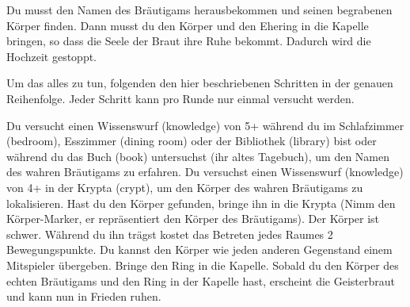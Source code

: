 





Du musst den Namen des Bräutigams herausbekommen und seinen begrabenen Körper finden. Dann musst du den Körper und den Ehering in die Kapelle bringen, so dass die Seele der Braut ihre Ruhe bekommt. Dadurch wird die Hochzeit gestoppt.

\newpage


Um das alles zu tun, folgenden den hier beschriebenen Schritten in der genauen Reihenfolge. Jeder Schritt kann pro Runde nur einmal versucht werden.
  \begin{itemize}
        \bitem Du versucht einen Wissenswurf (knowledge) von 5+ während du im Schlafzimmer (bedroom), Esszimmer (dining room) oder der Bibliothek (library) bist oder während du das Buch (book) untersuchst (ihr altes Tagebuch), um den Namen des wahren Bräutigams zu erfahren.
        \bitem Du versuchst einen Wissenswurf (knowledge) von 4+ in der Krypta (crypt), um den Körper des wahren Bräutigams zu lokalisieren.
        \bitem Hast du den Körper gefunden, bringe ihn in die Krypta (Nimm den Körper-Marker, er repräsentiert den Körper des Bräutigams). Der Körper ist schwer. Während du ihn trägst kostet das Betreten jedes Raumes 2 Bewegungspunkte. Du kannst den Körper wie jeden anderen Gegenstand einem Mitspieler übergeben.
        \bitem  Bringe den Ring in die Kapelle. Sobald du den Körper des echten Bräutigams und den Ring in der Kapelle hast, erscheint die Geisterbraut und kann nun in Frieden ruhen.
    \end{itemize}

